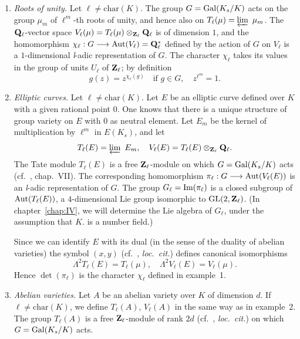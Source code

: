 
\begin{enumerate}[label=\arabic*.,leftmargin=2.2em,itemsep=0.15ex,topsep=0.4ex]
\item \emph{Roots of unity.}  Let $\ell \neq \mathrm{char}(K)$.  The
group $G = \mathrm{Gal}(K_s/K)$ acts on the group $\mu_m$ of $\ell^m$-th roots
of unity, and hence also on $T_\ell(\mu) = \varprojlim\ \mu_m$.  The
$\mathbf{Q}_\ell$-vector space $V_\ell(\mu) = T_\ell(\mu) \mathbin{\otimes}_{\mathbf{Z}_\ell}
\mathbf{Q}_\ell$ is of dimension $1$, and the homomorphism
$\chi_\ell : G \longrightarrow \mathrm{Aut}(V_\ell) = \mathbf{Q}_\ell^*$ defined by the
action of $G$ on $V_\ell$ is a $1$-dimensional \textit{l}-adic
representation of $G$.  The character $\chi_\ell$ takes its values in
the group of units $U_\ell$ of $\mathbf{Z}_\ell$; by definition
\[
g(z) = z^{\chi_\ell(g)} \quad\text{if } g \in G, \quad z^{\ell^m} = 1.
\]

\item \emph{Elliptic curves.}  Let $\ell \neq \mathrm{char}(K)$.  Let
$E$ be an elliptic curve defined over $K$ with a given rational point
$0$.  One knows that there is a unique structure of group variety on $E$
with $0$ as neutral element.  Let $E_m$ be the kernel of multiplication
by $\ell^m$ in $E(K_s)$, and let
\[
T_\ell(E) = \varprojlim\ E_m, \quad V_\ell(E) = T_\ell(E) \mathbin{\otimes}_{\mathbf{Z}_\ell} \mathbf{Q}_\ell.
\]
The Tate module $T_\ell(E)$ is a free $\mathbf{Z}_\ell$-module on which
$G = \mathrm{Gal}(K_s/K)$ acts (cf.~\cite{lang-abelian}, chap.~VII).  The
corresponding homomorphism $\pi_\ell : G \longrightarrow \mathrm{Aut}(V_\ell(E))$
is an \textit{l}-adic representation of $G$.  The group
$G_\ell = \mathrm{Im}(\pi_\ell)$ is a closed subgroup of $\mathrm{Aut}(T_\ell(E))$, a
$4$-dimensional Lie group isomorphic to $\mathrm{GL}(2, \mathbf{Z}_\ell)$.  (In
chapter~\ref{chap:IV}, we will determine the Lie algebra of $G_\ell$,
under the assumption that $K$. is a number field.)

Since we can identify $E$ with its dual (in the sense of the duality of
abelian varieties) the symbol $(x, y)$ (cf.~\cite{lang-abelian},
\emph{loc.~cit.}) defines canonical isomorphisms
\[
\Lambda^2 T_\ell(E) = T_\ell(\mu), \quad \Lambda^2 V_\ell(E) = V_\ell(\mu).
\]
Hence $\det(\pi_\ell)$ is the character $\chi_\ell$ defined in
example~1.

\item \emph{Abelian varieties.}  Let $A$ be an abelian variety over $K$
of dimension $d$.  If $\ell \neq \mathrm{char}(K)$, we define
$T_\ell(A)$, $V_\ell(A)$ in the same way as in example~2.  The group
$T_\ell(A)$ is a free $\mathbf{Z}_\ell$-module of rank $2d$
(cf.~\cite{lang-abelian}, \emph{loc.~cit.}) on which
$G = \mathrm{Gal}(K_s/K)$ acts.


\end{enumerate}
